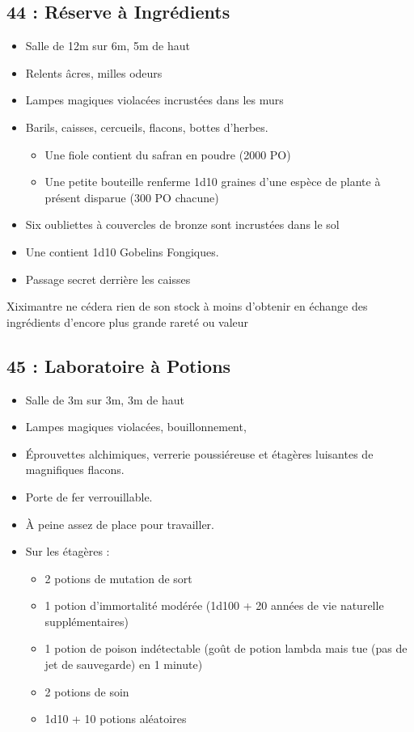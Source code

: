\subsection{44 : Réserve à Ingrédients}\label{n3:s44}
\begin{itemize}
  \item Salle de 12m sur 6m, 5m de haut 
  \item Relents âcres, milles odeurs
  \item Lampes magiques violacées incrustées dans les murs 
  \item Barils, caisses, cercueils, flacons, bottes d’herbes.
  \begin{itemize}
    \item Une fiole contient du safran en poudre (2000 PO)
    \item Une petite bouteille renferme  1d10 graines d’une espèce de plante à présent disparue (300 PO chacune)
  \end{itemize}
  \item Six oubliettes à couvercles de bronze sont incrustées dans le sol
  \item Une contient  1d10 Gobelins Fongiques.
  \item Passage secret derrière les caisses
\end{itemize}

Xiximantre ne cédera rien de son stock à moins d’obtenir en échange des ingrédients d’encore plus grande rareté ou valeur

\vfill
\pagebreak
\subsection{45 : Laboratoire à Potions}\label{n3:s45}
\begin{itemize}
  \item Salle de 3m sur 3m, 3m de haut 
  \item Lampes magiques violacées, bouillonnement,
  \item Éprouvettes alchimiques, verrerie poussiéreuse et étagères luisantes de magnifiques flacons.
  \item Porte de fer verrouillable. 
  \item À peine assez de place pour travailler.
  \item Sur les étagères : 
  \begin{itemize}
    \item 2 potions de mutation de sort
    \item 1 potion d’immortalité modérée (1d100 + 20 années de vie naturelle supplémentaires)
    \item 1 potion de poison indétectable (goût de potion lambda mais tue (pas de jet de sauvegarde) en 1 minute)
    \item 2 potions de soin
    \item 1d10 + 10 potions aléatoires
  \end{itemize}
\end{itemize}

